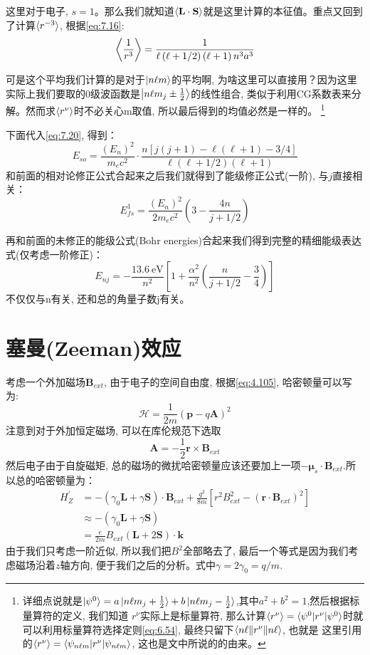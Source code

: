 \documentclass[a4paper,zihao=-4,linespread=1]{ctexrep}
\begin{document}
    这里对于电子, $s=1$。那么我们就知道$\braket{\mathbf{L}\cdot\mathbf{S}}$就是这里计算的本征值。重点又回到了计算$\braket{r^{-3}}$, 根据\ref{eq:7.16}:
    \[\Braket{\frac{1}{r^3}}=\frac{1}{\ell\left(\ell+1/2\right)\left(\ell+1\right)n^3a^3}\]
    
    可是这个平均我们计算的是对于$\ket{n\ell m}$的平均啊, 为啥这里可以直接用？因为这里实际上我们要取的0级波函数是$\Ket{n\ell m_j\pm\frac{1}{2}}$的线性组合,
    类似于利用CG系数表来分解。然而求$\braket{r^\nu}$时不必关心m取值, 所以最后得到的均值必然是一样的。
    \footnote{详细点说就是$\ket{\psi^0}=a\ket{n\ell m_j+\frac{1}{2}}+b\ket{n\ell m_j-\frac{1}{2}}$,其中$a^2+b^2=1$,然后根据标量算符的定义, 我们知道
    $r^\nu$实际上是标量算符, 那么计算$\braket{r^\nu}=\braket{\psi^0|r^\nu|\psi^0}$时就可以利用标量算符选择定则\ref{eq:6.54}, 最终只留下$\braket{n\ell\|r^\nu\|n\ell}$, 也就是
    这里引用的$\braket{r^\nu}=\braket{\psi_{n\ell m}|r^\nu|\psi_{n\ell m}}$, 这也是文中所说的的由来。}

    下面代入\ref{eq:7.20}, 得到：
    \[E_{so}=\frac{(E_n)^2}{m_ec^2}\cdot\frac{n\left[j\left(j+1\right)-\ell\left(\ell+1\right)-3/4\right]}{\ell(\ell+1/2)(\ell+1)}\]
    和前面的相对论修正公式合起来之后我们就得到了能级修正公式(一阶), 与$j$直接相关：
    \begin{equation}
        E^1_{fs}=\frac{(E_n)^2}{2m_ec^2}\left(3-\frac{4n}{j+1/2}\right)
    \end{equation}
    
    再和前面的未修正的能级公式(Bohr energies)合起来我们得到完整的精细能级表达式(仅考虑一阶修正)：
    \begin{equation}
        \label{eq:7.23}
        \boxed{E_{nj}=-\frac{\SI{13.6}{\electronvolt}}{n^2}\left[1+\frac{\alpha^2}{n^2}\left(\frac{n}{j+1/2}-\frac{3}{4}\right)\right]}
    \end{equation}
    不仅仅与n有关, 还和总的角量子数j有关。
    
    \section{塞曼(Zeeman)效应}
    考虑一个外加磁场$\mathbf{B}_{ext}$, 由于电子的空间自由度, 根据\ref{eq:4.105}, 哈密顿量可以写为:
    \[\mathcal{H}=\frac{1}{2m}\left(\mathbf{p}-q\mathbf{A}\right)^2\]
    注意到对于外加恒定磁场, 可以在库伦规范下选取$$\mathbf{A}=-\frac{1}{2}\mathbf{r}\times\mathbf{B}_{ext}$$然后电子由于自旋磁矩, 总的磁场的微扰哈密顿量应该还要加上一项$-\mathbf{\mu}_s\cdot\mathbf{B}_{ext}$.所以总的哈密顿量为：
    \begin{align*}
        H_Z^\prime&=-\left(\gamma_0\mathbf{L}+\gamma\mathbf{S}\right)\cdot\mathbf{B}_{ext}+\frac{q^2}{8m}\left[r^2B_{ext}^2-\left(\mathbf{r}\cdot\mathbf{B}_{ext}\right)^2\right]\\
        &\approx -\left(\gamma_0\mathbf{L}+\gamma\mathbf{S}\right)\\
        &=\frac{e}{2m}B_{ext}\left(\mathbf{L}+2\mathbf{S}\right)\cdot\mathbf{k}
    \end{align*}
    由于我们只考虑一阶近似, 所以我们把$B^2$全部略去了, 最后一个等式是因为我们考虑磁场沿着$z$轴方向, 便于我们之后的分析。式中$\gamma=2\gamma_0=q/m$.
\end{document}
